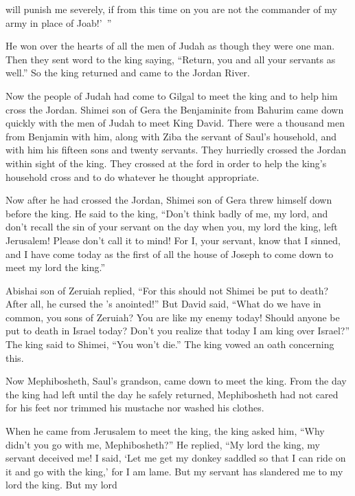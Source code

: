 {will punish me severely,
if
from this time on
you are not
the commander
of my army
in place
of Joab!’ ”
\par }{\PP {}He won
over the
hearts
of all
the men
of Judah
as though they were one
man.
Then they sent
word to
the king
saying, “Return,
you
and all
your servants as well.”
So the king
returned
and came
to
the Jordan River.
\par }{\PP Now the people of Judah
had come
to Gilgal
to meet
the king
and to help
him cross
the
Jordan.
Shimei
son
of Gera
the Benjaminite
from Bahurim
came down
quickly
with
the men
of Judah
to meet
King
David.
There were a thousand
men
from Benjamin
with him, along with
Ziba
the servant
of Saul’s
household,
and with him
his fifteen
sons
and twenty
servants.
They hurriedly
crossed the Jordan
within sight
of the king.
They crossed
at the ford
in order to help the
king’s
household
cross
and to do
whatever
he thought appropriate.
\par }{\PP Now after he had crossed
the Jordan,
Shimei
son
of Gera
threw
himself down before
the king.
He said
to
the king,
“Don’t
think badly
of me, my lord,
and don’t
recall
the sin
of your servant
on the day
when
you, my lord
the king,
left
Jerusalem! Please don’t
call it
to
mind!
For
I, your servant,
know
that
I
sinned,
and I have come
today
as the first
of all
the house
of Joseph
to come down
to meet
my lord
the king.”
\par }{\PP {}Abishai
son
of Zeruiah
replied,
“For
this
should not
Shimei
be put to death? After all, he cursed
the
{}’s
anointed!”
But David
said,
“What
do we have in common, you sons
of Zeruiah? You are like my enemy
today! Should anyone
be put to death
in Israel
today? Don’t
you realize
that
today
I
am king
over
Israel?”
The king
said
to
Shimei,
“You won’t
die.”
The king
vowed an oath concerning this.
\par }{\PP {}Now Mephibosheth,
Saul’s
grandson,
came down
to meet
the king.
From
the day
the king
had left
until
the day
he safely
returned,
Mephibosheth had not
cared for his feet
nor trimmed
his mustache
nor
washed
his clothes.
\par }{\PP {}When
he came
from Jerusalem
to meet
the king,
the king
asked
him, “Why
didn’t
you go
with
me, Mephibosheth?”
He replied,
“My lord
the king,
my servant
deceived
me! I said,
‘Let me get my donkey
saddled
so that I can ride
on
it and go
with
the king,’
for
I
am lame.
But my servant
has slandered
me to
my lord
the king.
But my lord
}
